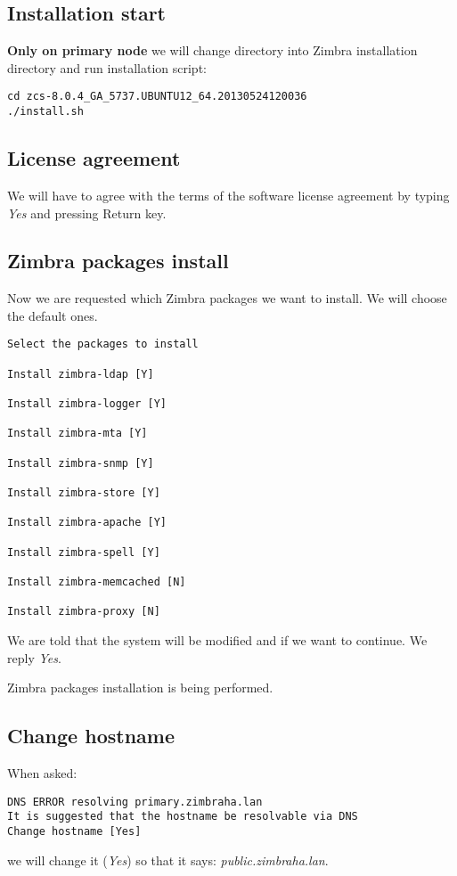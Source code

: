 \subsection {Installation start}
\textbf{Only on primary node} we will change directory into Zimbra installation directory and run installation script:

\begin{verbatim}
cd zcs-8.0.4_GA_5737.UBUNTU12_64.20130524120036
./install.sh
\end{verbatim}
\subsection {License agreement}
We will have to agree with the terms of the software license agreement by typing \textit{Yes} and pressing Return key.

\subsection {\label{subsec:zimbra-packages-install}Zimbra packages install}
Now we are requested which Zimbra packages we want to install. We will choose the default ones.

\begin{verbatim}
Select the packages to install

Install zimbra-ldap [Y] 

Install zimbra-logger [Y] 

Install zimbra-mta [Y] 

Install zimbra-snmp [Y] 

Install zimbra-store [Y] 

Install zimbra-apache [Y] 

Install zimbra-spell [Y] 

Install zimbra-memcached [N] 

Install zimbra-proxy [N] 
\end{verbatim}

We are told that the system will be modified and if we want to continue. We reply \textit{Yes}.

Zimbra packages installation is being performed.

\subsection {Change hostname}
When asked:
\begin{verbatim}
DNS ERROR resolving primary.zimbraha.lan
It is suggested that the hostname be resolvable via DNS
Change hostname [Yes]
\end{verbatim}
we will change it (\textit{Yes}) so that it says: \textit{public.zimbraha.lan}.

